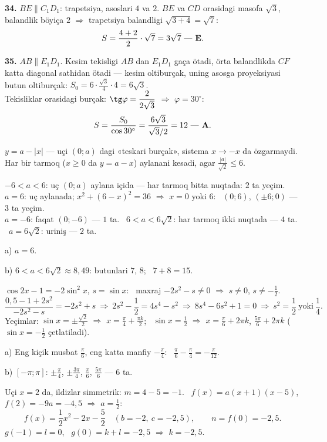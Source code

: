 \textbf{34.} $BE\parallel C_1D_1$: trapetsiya, asoslari $4$ va $2$. $BE$ va $CD$ orasidagi masofa $\sqrt3$, balandlik böyiça $2$ $\Rightarrow$ trapetsiya balandligi $\sqrt{3+4}=\sqrt7$:
\[S=\frac{4+2}2\cdot\sqrt7=3\sqrt7\ \text{— \textbf{E}}.\]

\textbf{35.} $AB\parallel E_1D_1$. Kesim tekisligi $AB$ dan $E_1D_1$ gaça ötadi, örta balandlikda $CF$ katta diagonal sathidan ötadi — kesim oltiburçak, uning asosga proyeksiyasi butun oltiburçak: $S_0=6\cdot\frac{\sqrt3}4\cdot4=6\sqrt3$.\\
Tekisliklar orasidagi burçak: $\tg\varphi=\dfrac2{2\sqrt3}$ $\Rightarrow$ $\varphi=30^\circ$:
\[S=\frac{S_0}{\cos30^\circ}=\frac{6\sqrt3}{\sqrt3/2}=12\ \text{— \textbf{A}}.\]

\newpage
{}
$y=a-|x|$ — uçi $(0;a)$ dagi «teskari burçak», sistema $x\to-x$ da özgarmaydi. Har bir tarmoq ($x\ge0$ da $y=a-x$) aylanani kesadi, agar $\frac{|a|}{\sqrt2}\le6$.

$-6<a<6$: uç $(0;a)$ aylana içida — har tarmoq bitta nuqtada: $2$ ta yeçim.\\
$a=6$: uç aylanada; $x^2+(6-x)^2=36$ $\Rightarrow$ $x=0$ yoki $6$: \ $(0;6)$, $(\pm6;0)$ — $3$ ta yeçim.\\
$a=-6$: faqat $(0;-6)$ — $1$ ta. \ $6<a<6\sqrt2$: har tarmoq ikki nuqtada — $4$ ta. \ $a=6\sqrt2$: uriniş — $2$ ta.

a) $a=6$.

b) $6<a<6\sqrt2\approx8{,}49$: butunlari $7$, $8$; \ $7+8=15$.

\newpage
{}
$\cos2x-1=-2\sin^2x$, $s=\sin x$: \ maxraj $-2s^2-s\ne0$ $\Rightarrow$ $s\ne0$, $s\ne-\frac12$.
\[\frac{0{,}5-1+2s^2}{-2s^2-s}=-2s^2+s\ \Rightarrow\ 2s^2-\frac12=4s^4-s^2\ \Rightarrow\ 8s^4-6s^2+1=0\ \Rightarrow\ s^2=\frac12\ \text{yoki}\ \frac14.\]
Yeçimlar: $\sin x=\pm\frac{\sqrt2}2$ $\Rightarrow$ $x=\frac\pi4+\frac{\pi k}2$; \ $\sin x=\frac12$ $\Rightarrow$ $x=\frac\pi6+2\pi k$, $\frac{5\pi}6+2\pi k$ ($\sin x=-\frac12$ çetlatiladi).

a) Eng kiçik musbat $\frac\pi6$, eng katta manfiy $-\frac\pi4$: \ $\frac\pi6-\frac\pi4=-\frac\pi{12}$.

b) $[-\pi;\pi]$: $\pm\frac\pi4$, $\pm\frac{3\pi}4$, $\frac\pi6$, $\frac{5\pi}6$ — $6$ ta.

\newpage
{}
Uçi $x=2$ da, ildizlar simmetrik: $m=4-5=-1$. \ $f(x)=a(x+1)(x-5)$, $f(2)=-9a=-4{,}5$ $\Rightarrow$ $a=\frac12$:
\[f(x)=\frac12x^2-2x-\frac52\quad(b=-2,\ c=-2{,}5),\qquad n=f(0)=-2{,}5.\]
$g(-1)=l=0$, \ $g(0)=k+l=-2{,}5$ $\Rightarrow$ $k=-2{,}5$.

